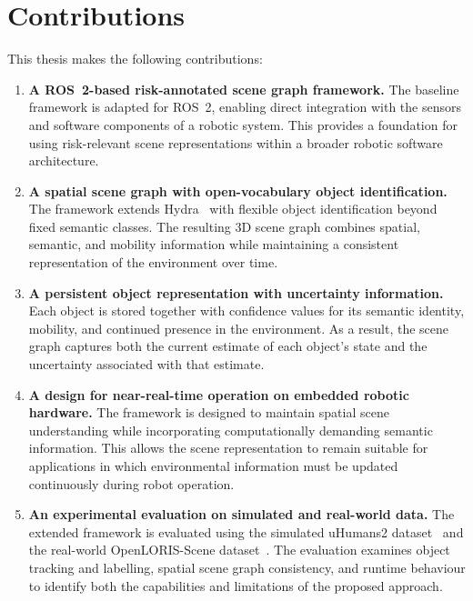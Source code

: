 \section{Contributions}

{\small This thesis makes the following contributions:\par}

\begin{enumerate}
    \item {\small \textbf{A ROS~2-based risk-annotated scene graph framework.} The baseline framework is adapted for ROS~2, enabling direct integration with the sensors and software components of a robotic system. This provides a foundation for using risk-relevant scene representations within a broader robotic software architecture.\par}

    \item {\small \textbf{A spatial scene graph with open-vocabulary object identification.} The framework extends Hydra~\cite{hughes2022hydra} with flexible object identification beyond fixed semantic classes. The resulting 3D scene graph combines spatial, semantic, and mobility information while maintaining a consistent representation of the environment over time.\par}

    \item {\small \textbf{A persistent object representation with uncertainty information.} Each object is stored together with confidence values for its semantic identity, mobility, and continued presence in the environment. As a result, the scene graph captures both the current estimate of each object's state and the uncertainty associated with that estimate.\par}
    
    \item {\small \textbf{A design for near-real-time operation on embedded robotic hardware.} The framework is designed to maintain spatial scene understanding while incorporating computationally demanding semantic information. This allows the scene representation to remain suitable for applications in which environmental information must be updated continuously during robot operation.\par}

    \item {\small \textbf{An experimental evaluation on simulated and real-world data.} The extended framework is evaluated using the simulated uHumans2 dataset~\cite{rosinol2021kimera} and the real-world OpenLORIS-Scene dataset~\cite{shi2020openloris}. The evaluation examines object tracking and labelling, spatial scene graph consistency, and runtime behaviour to identify both the capabilities and limitations of the proposed approach.\par}
\end{enumerate}
